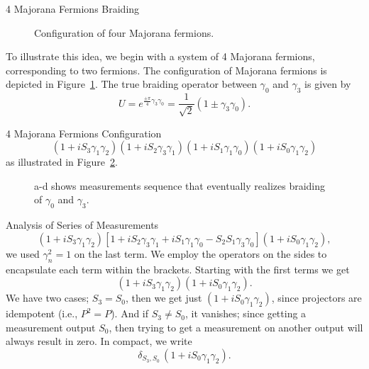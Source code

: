 \documentclass{loyola-beamer}
\begin{document}
\begin{frame}{4 Majorana Fermions Braiding}
	\begin{figure}
		\begin{center}
			
		\end{center}
		\caption{Configuration of four Majorana fermions.}
		\label{fig:4 mf conf}
	\end{figure}
	To illustrate this idea, we begin with a system of 4 Majorana fermions, corresponding to two fermions. The configuration of Majorana fermions is depicted in Figure~\ref{fig:4 mf conf}. The true braiding operator between $\gamma_0$ and $\gamma_3$ is given by
	\begin{equation}
		U = e^{\frac{\pm \pi}{4} \gamma_3 \gamma_0} = \frac{1}{\sqrt{2}} (1 \pm \gamma_3 \gamma_0).
		\label{eq:braiding op}
	\end{equation}
\end{frame}

\begin{frame}{4 Majorana Fermions Configuration}
	\[
		(1 + iS_3 \gamma_1 \gamma_2) (1 + iS_2 \gamma_3 \gamma_1) (1 + iS_1 \gamma_1 \gamma_0) (1 + iS_0 \gamma_1 \gamma_2)
	\]
	as illustrated in Figure~\ref{fig:meas 4 mfs}.
	\begin{figure}
		\begin{center}
			
		\end{center}
		\caption{a-d shows measurements sequence that eventually realizes braiding of $ \gamma_0 $ and $ \gamma_3 $.}
		\label{fig:meas 4 mfs}
	\end{figure}
\end{frame}

\begin{frame}{Analysis of Series of Measurements}
	\[
		(1 + iS_3 \gamma_1 \gamma_2)
		[1 + iS_2 \gamma_3 \gamma_1 + iS_1 \gamma_1 \gamma_0 - S_2 S_1 \gamma_3 \gamma_0]
		(1 + iS_0 \gamma_1 \gamma_2),
	\]
	we used $ \gamma_n^2 = 1 $ on the last term. We employ the operators on the sides to encapsulate each term within the brackets. Starting with the first terms we get
	\[
		(1 + iS_3 \gamma_1 \gamma_2) (1 + iS_0 \gamma_1 \gamma_2).
	\]
	We have two cases; $ S_3 = S_0 $, then we get just $ (1 + iS_0 \gamma_1 \gamma_2) $, since projectors are idempotent (i.e., $ P^2 = P $). And if $ S_3 \ne S_0 $, it vanishes; since getting a measurement output $ S_0 $, then trying to get a measurement on another output will always result in zero. In compact, we write
	\[
		\delta_{S_3, S_0} \, (1 + iS_0 \gamma_1 \gamma_2).
	\]
\end{frame}
\end{document}
